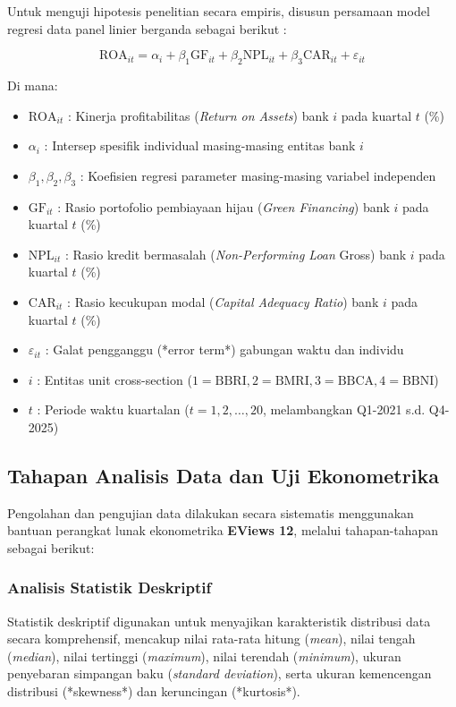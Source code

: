 \documentclass[12pt,a4paper]{article}
\numberwithin{equation}{section}
\begin{document}
\noindent
Untuk menguji hipotesis penelitian secara empiris, disusun persamaan model regresi data panel linier berganda sebagai berikut \citep{GujaratiPorter2020, Wooldridge2020}:

\begin{equation}
  \text{ROA}_{it} = \alpha_i + \beta_1 \text{GF}_{it} + \beta_2 \text{NPL}_{it} + \beta_3 \text{CAR}_{it} + \varepsilon_{it}
  \label{eq:regresi_panel}
\end{equation}

\noindent Di mana:
\begin{itemize}
  \item $\text{ROA}_{it}$ : Kinerja profitabilitas (\emph{Return on Assets}) bank $i$ pada kuartal $t$ (\%)
  \item $\alpha_i$ : Intersep spesifik individual masing-masing entitas bank $i$
  \item $\beta_1, \beta_2, \beta_3$ : Koefisien regresi parameter masing-masing variabel independen
  \item $\text{GF}_{it}$ : Rasio portofolio pembiayaan hijau (\emph{Green Financing}) bank $i$ pada kuartal $t$ (\%)
  \item $\text{NPL}_{it}$ : Rasio kredit bermasalah (\emph{Non-Performing Loan} Gross) bank $i$ pada kuartal $t$ (\%)
  \item $\text{CAR}_{it}$ : Rasio kecukupan modal (\emph{Capital Adequacy Ratio}) bank $i$ pada kuartal $t$ (\%)
  \item $\varepsilon_{it}$ : Galat pengganggu (*error term*) gabungan waktu dan individu
  \item $i$ : Entitas unit cross-section ($1 = \text{BBRI}, 2 = \text{BMRI}, 3 = \text{BBCA}, 4 = \text{BBNI}$)
  \item $t$ : Periode waktu kuartalan ($t = 1, 2, \dots, 20$, melambangkan Q1-2021 s.d. Q4-2025)
\end{itemize}

\subsection{Tahapan Analisis Data dan Uji Ekonometrika}

\noindent
Pengolahan dan pengujian data dilakukan secara sistematis menggunakan bantuan perangkat lunak ekonometrika \textbf{EViews 12}, melalui tahapan-tahapan sebagai berikut:

\subsubsection{Analisis Statistik Deskriptif}
\noindent
Statistik deskriptif digunakan untuk menyajikan karakteristik distribusi data secara komprehensif, mencakup nilai rata-rata hitung (\emph{mean}), nilai tengah (\emph{median}), nilai tertinggi (\emph{maximum}), nilai terendah (\emph{minimum}), ukuran penyebaran simpangan baku (\emph{standard deviation}), serta ukuran kemencengan distribusi (*skewness*) dan keruncingan (*kurtosis*).
\end{document}
